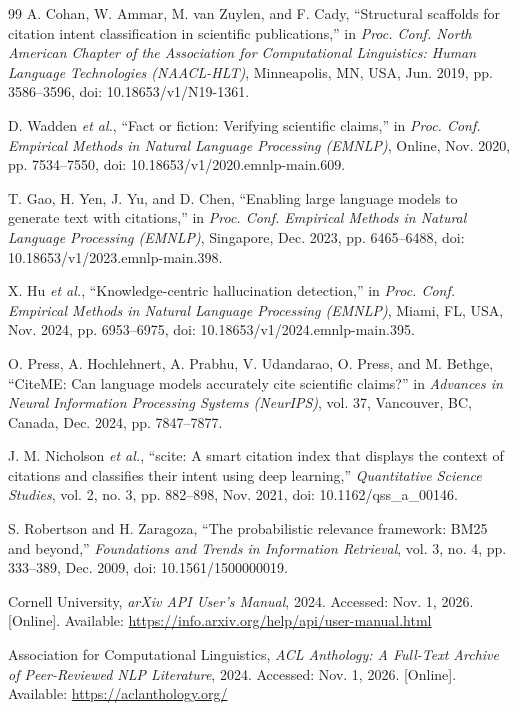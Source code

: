 \begin{thebibliography}{99}
A. Cohan, W. Ammar, M. van Zuylen, and F. Cady, ``Structural scaffolds for citation intent classification in scientific publications,'' in \textit{Proc. Conf. North American Chapter of the Association for Computational Linguistics: Human Language Technologies (NAACL-HLT)}, Minneapolis, MN, USA, Jun. 2019, pp. 3586--3596, doi: 10.18653/v1/N19-1361.

D. Wadden \textit{et al.}, ``Fact or fiction: Verifying scientific claims,'' in \textit{Proc. Conf. Empirical Methods in Natural Language Processing (EMNLP)}, Online, Nov. 2020, pp. 7534--7550, doi: 10.18653/v1/2020.emnlp-main.609.

T. Gao, H. Yen, J. Yu, and D. Chen, ``Enabling large language models to generate text with citations,'' in \textit{Proc. Conf. Empirical Methods in Natural Language Processing (EMNLP)}, Singapore, Dec. 2023, pp. 6465--6488, doi: 10.18653/v1/2023.emnlp-main.398.

X. Hu \textit{et al.}, ``Knowledge-centric hallucination detection,'' in \textit{Proc. Conf. Empirical Methods in Natural Language Processing (EMNLP)}, Miami, FL, USA, Nov. 2024, pp. 6953--6975, doi: 10.18653/v1/2024.emnlp-main.395.

O. Press, A. Hochlehnert, A. Prabhu, V. Udandarao, O. Press, and M. Bethge, ``CiteME: Can language models accurately cite scientific claims?'' in \textit{Advances in Neural Information Processing Systems (NeurIPS)}, vol. 37, Vancouver, BC, Canada, Dec. 2024, pp. 7847--7877.

J. M. Nicholson \textit{et al.}, ``scite: A smart citation index that displays the context of citations and classifies their intent using deep learning,'' \textit{Quantitative Science Studies}, vol. 2, no. 3, pp. 882--898, Nov. 2021, doi: 10.1162/qss\_a\_00146.

S. Robertson and H. Zaragoza, ``The probabilistic relevance framework: BM25 and beyond,'' \textit{Foundations and Trends in Information Retrieval}, vol. 3, no. 4, pp. 333--389, Dec. 2009, doi: 10.1561/1500000019.

Cornell University, \textit{arXiv API User's Manual}, 2024. Accessed: Nov. 1, 2026. [Online]. Available: \url{https://info.arxiv.org/help/api/user-manual.html}

Association for Computational Linguistics, \textit{ACL Anthology: A Full-Text Archive of Peer-Reviewed NLP Literature}, 2024. Accessed: Nov. 1, 2026. [Online]. Available: \url{https://aclanthology.org/}


\end{thebibliography}

